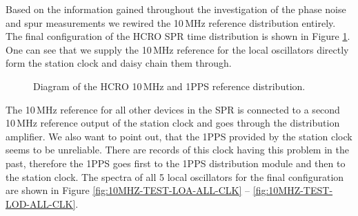 \documentclass[12pt]{article}
\begin{document}
Based on the information gained throughout the investigation of the phase noise and spur measurements we rewired the 10\,MHz reference distribution entirely.
The final configuration of the HCRO SPR time distribution is shown in Figure \ref{fig:Time-Distribution-HCRO-03-11-2020}. One can see that we supply the 10\,MHz reference for the local oscillators directly form the station clock and daisy chain them through. 
%
\begin{figure}[ht!]
\caption{Diagram of the HCRO 10\,MHz and 1PPS reference distribution.}
\label{fig:Time-Distribution-HCRO-03-11-2020}
\end{figure}
%
The 10\,MHz reference for all other devices in the SPR is connected to a second 10\,MHz reference output of the station clock and goes through the distribution amplifier. We also want to point out, that the 1PPS provided by the station clock seems to be unreliable. There are records of this clock having this problem in the past, therefore the 1PPS goes first to the 1PPS distribution module and then to the station clock. The spectra of all 5 local oscillators for the final configuration are shown in Figure \ref{fig:10MHZ-TEST-LOA-ALL-CLK} -- \ref{fig:10MHZ-TEST-LOD-ALL-CLK}.
\end{document}
